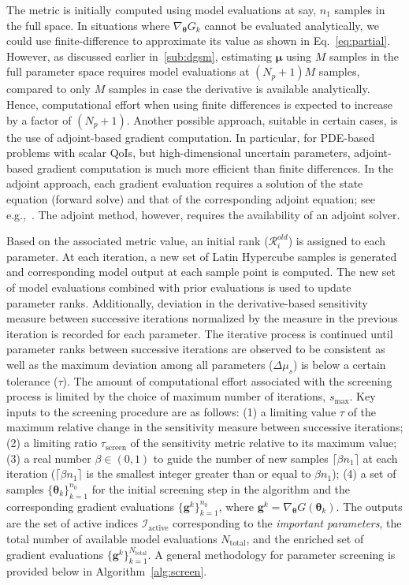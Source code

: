 The metric is initially computed using model evaluations at say, $n_1$ samples
in the full space. 
In situations where $\nabla_{\bm{\theta}}G_k$ cannot be evaluated analytically,
we could use finite-difference to approximate its value as shown in
Eq.~\ref{eq:partial}. However, as discussed earlier in~\ref{sub:dgsm},
estimating $\bm{\mu}$  using $M$ samples in the full parameter space requires
model evaluations at $(N_p+1)M$ samples, compared to only $M$ samples in case
the derivative is available analytically. Hence, computational effort when
using finite differences is expected to increase by a factor of $(N_p+1)$.
Another possible approach, suitable in certain cases, is the use of
adjoint-based gradient computation. In particular, for PDE-based
problems with scalar QoIs, but high-dimensional uncertain parameters, 
adjoint-based gradient computation is much more efficient than finite differences.
In the adjoint approach, each gradient evaluation requires 
a solution of the state equation (forward solve) and that of the 
corresponding adjoint equation; 
see e.g.,~\cite{jameson1988aerodynamic,gunzburger2003perspectives,Borzi2011}.
The adjoint method, however, requires the availability of an adjoint solver.

Based on the associated metric value, an initial
rank ($\mathcal{R}_i^{old}$) is assigned to each parameter. At each iteration,
a new set of Latin Hypercube samples is generated and corresponding model
output at each sample point is computed. The new set of model evaluations
combined with prior evaluations is used to update parameter ranks. Additionally,
deviation in the derivative-based sensitivity measure between successive iterations
normalized by the measure in the previous iteration is recorded for each parameter.
The iterative process is continued until parameter ranks between successive iterations
are observed to be consistent as well as the maximum deviation among all parameters
($\Delta\mu_s$) is below a certain tolerance ($\tau$). The amount of computational
effort associated with the screening process is limited
by the choice of maximum number of iterations, $s_\text{max}$. 
Key inputs to the screening procedure
are as follows: (1) 
a limiting value $\tau$ of the maximum relative change in the sensitivity
measure between successive iterations; (2) 
a limiting ratio $\tau_\text{screen}$ of the sensitivity metric 
relative to its maximum value;
(3) a real number $\beta \in (0, 1)$ to 
guide the number of new samples $\lceil \beta n_1 \rceil$ 
at each iteration ($\lceil \beta n_1
\rceil$ 
is the smallest integer greater than or equal to $\beta n_1$); 
(4) a set of samples $\{ \bm{\theta}_k \}_{k = 1}^{n_0}$ 
for the initial screening step in
the algorithm and the corresponding gradient evaluations 
$\{ \bm{g}^k \}_{k=1}^{n_0}$, where
$\bm{g}^k = \nabla_{\bm{\theta}} G(\bm{\theta}_k)$. 
The outputs are the set of active
indices $\mathcal{I}_\text{active}$ corresponding to the 
\emph{important parameters}, the total number of available model 
evaluations $N_\text{total}$, and the enriched set of gradient evaluations 
$\{ \bm{g}^k\}_{k=1}^{N_\text{total}}$. 
A general methodology for parameter screening is provided below in
Algorithm~\ref{alg:screen}.

